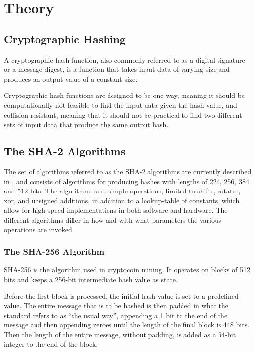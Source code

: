 \chapter{Theory}

\section{Cryptographic Hashing}

A cryptographic hash function, also commonly referred to as a digital signature or
a message digest, is a function that takes input data of varying size and
produces an output value of a constant size\cite{hashing-overview}.

Cryptographic hash functions are designed to be one-way, meaning it should
be computationally not feasible to find the input data given the hash value,
and collision resistant, meaning that it should not be practical to find two
different sets of input data that produce the same output hash\cite{sha-spec}.

\section{The SHA-2 Algorithms}

The set of algorithms referred to as the SHA-2 algorithms are currently described in \cite{fips180-4},
and consists of algorithms for producing hashes with lengths of 224, 256, 384 and 512 bits.
The algorithms uses simple operations, limited to shifts, rotates, xor, and unsigned additions,
in addition to a lookup-table of constants, which allow for high-speed implementations in both
software and hardware. The different algorithms differ in how and with what parameters the various
operations are invoked.

\subsection{The SHA-256 Algorithm\cite{sha-spec}}

SHA-256 is the algorithm used in cryptocoin mining. It operates on blocks of 512 bits
and keeps a 256-bit intermediate hash value as state.

Before the first block is processed, the initial hash value is set to a predefined
value. The entire message that is to be hashed is then padded in what the standard
refers to as ``the usual way'', appending a 1 bit to the end of the message and then
appending zeroes until the length of the final block is 448 bits. Then the length of
the entire message, without padding, is added as a 64-bit integer to the end of the
block.

